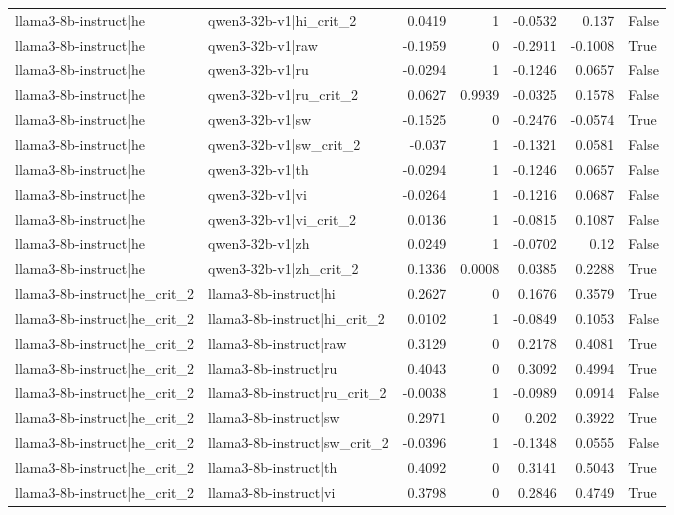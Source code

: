 \begin{table}
\begin{tabular}{l l r r r r l}
llama3-8b-instruct|he & qwen3-32b-v1|hi_crit_2 & 0.0419 & 1 & -0.0532 & 0.137 & False \\
llama3-8b-instruct|he & qwen3-32b-v1|raw & -0.1959 & 0 & -0.2911 & -0.1008 & True \\
llama3-8b-instruct|he & qwen3-32b-v1|ru & -0.0294 & 1 & -0.1246 & 0.0657 & False \\
llama3-8b-instruct|he & qwen3-32b-v1|ru_crit_2 & 0.0627 & 0.9939 & -0.0325 & 0.1578 & False \\
llama3-8b-instruct|he & qwen3-32b-v1|sw & -0.1525 & 0 & -0.2476 & -0.0574 & True \\
llama3-8b-instruct|he & qwen3-32b-v1|sw_crit_2 & -0.037 & 1 & -0.1321 & 0.0581 & False \\
llama3-8b-instruct|he & qwen3-32b-v1|th & -0.0294 & 1 & -0.1246 & 0.0657 & False \\
llama3-8b-instruct|he & qwen3-32b-v1|vi & -0.0264 & 1 & -0.1216 & 0.0687 & False \\
llama3-8b-instruct|he & qwen3-32b-v1|vi_crit_2 & 0.0136 & 1 & -0.0815 & 0.1087 & False \\
llama3-8b-instruct|he & qwen3-32b-v1|zh & 0.0249 & 1 & -0.0702 & 0.12 & False \\
llama3-8b-instruct|he & qwen3-32b-v1|zh_crit_2 & 0.1336 & 0.0008 & 0.0385 & 0.2288 & True \\
llama3-8b-instruct|he_crit_2 & llama3-8b-instruct|hi & 0.2627 & 0 & 0.1676 & 0.3579 & True \\
llama3-8b-instruct|he_crit_2 & llama3-8b-instruct|hi_crit_2 & 0.0102 & 1 & -0.0849 & 0.1053 & False \\
llama3-8b-instruct|he_crit_2 & llama3-8b-instruct|raw & 0.3129 & 0 & 0.2178 & 0.4081 & True \\
llama3-8b-instruct|he_crit_2 & llama3-8b-instruct|ru & 0.4043 & 0 & 0.3092 & 0.4994 & True \\
llama3-8b-instruct|he_crit_2 & llama3-8b-instruct|ru_crit_2 & -0.0038 & 1 & -0.0989 & 0.0914 & False \\
llama3-8b-instruct|he_crit_2 & llama3-8b-instruct|sw & 0.2971 & 0 & 0.202 & 0.3922 & True \\
llama3-8b-instruct|he_crit_2 & llama3-8b-instruct|sw_crit_2 & -0.0396 & 1 & -0.1348 & 0.0555 & False \\
llama3-8b-instruct|he_crit_2 & llama3-8b-instruct|th & 0.4092 & 0 & 0.3141 & 0.5043 & True \\
llama3-8b-instruct|he_crit_2 & llama3-8b-instruct|vi & 0.3798 & 0 & 0.2846 & 0.4749 & True \\

\end{tabular}
\end{table}
